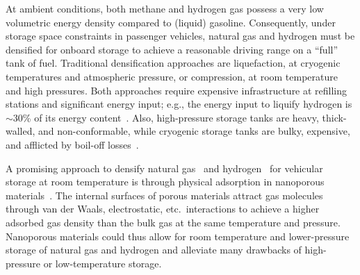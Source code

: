 \documentclass[twoside,twocolumn,9pt]{article}
\begin{document}
At ambient conditions, both methane and hydrogen gas possess a very low
volumetric energy density compared to (liquid) gasoline. Consequently, under storage
space constraints in passenger vehicles, natural gas and hydrogen must be
densified for onboard storage to achieve a reasonable driving range on a
``full'' tank of fuel. Traditional densification approaches are liquefaction,
at cryogenic temperatures and atmospheric pressure, or compression, at room
temperature and high pressures. Both approaches require expensive
infrastructure at refilling stations and significant energy input; e.g., the
energy input to liquify hydrogen is $\sim$30\% of its energy
content~\cite{bossel2003energy}. Also, high-pressure storage tanks are
heavy, thick-walled, and non-conformable, while cryogenic storage tanks are
bulky, expensive, and afflicted by boil-off losses~\cite{hasan2009minimizing}.

A promising approach to densify natural
gas~\cite{makal2012methane,mason2014evaluating} and
hydrogen~\cite{suh2011hydrogen,garcia2018benchmark} for vehicular storage at
room temperature is through physical adsorption in nanoporous
materials~\cite{schoedel2016role}. The internal surfaces of porous materials
attract gas molecules through van der Waals, electrostatic, etc.\ interactions
to achieve a higher adsorbed gas density than the bulk gas at the same
temperature and pressure.
Nanoporous materials could thus allow for room temperature and lower-pressure
storage of natural gas and hydrogen and alleviate many drawbacks of high-pressure or low-temperature
storage.
\end{document}
